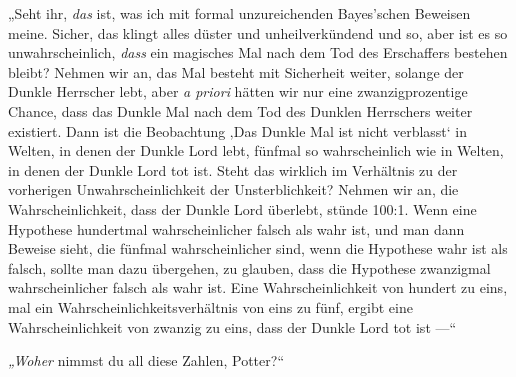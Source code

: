 „Seht ihr, \emph{das} ist, was ich mit formal unzureichenden Bayes’schen Beweisen meine. Sicher, das klingt alles düster und unheilverkündend und so, aber ist es so unwahrscheinlich, \emph{dass} ein magisches Mal nach dem Tod des Erschaffers bestehen bleibt? Nehmen wir an, das Mal besteht mit Sicherheit weiter, solange der Dunkle Herrscher lebt, aber \emph{a priori} hätten wir nur eine zwanzigprozentige Chance, dass das Dunkle Mal nach dem Tod des Dunklen Herrschers weiter existiert. Dann ist die Beobachtung ‚Das Dunkle Mal ist nicht verblasst‘ in Welten, in denen der Dunkle Lord lebt, fünfmal so wahrscheinlich wie in Welten, in denen der Dunkle Lord tot ist. Steht das wirklich im Verhältnis zu der vorherigen Unwahrscheinlichkeit der Unsterblichkeit? Nehmen wir an, die Wahrscheinlichkeit, dass der Dunkle Lord überlebt, stünde 100:1. Wenn eine Hypothese hundertmal wahrscheinlicher falsch als wahr ist, und man dann Beweise sieht, die fünfmal wahrscheinlicher sind, wenn die Hypothese wahr ist als falsch, sollte man dazu übergehen, zu glauben, dass die Hypothese zwanzigmal wahrscheinlicher falsch als wahr ist. Eine Wahrscheinlichkeit von hundert zu eins, mal ein Wahrscheinlichkeitsverhältnis von eins zu fünf, ergibt eine Wahrscheinlichkeit von zwanzig zu eins, dass der Dunkle Lord tot ist —“

\emph{„Woher} nimmst du all diese Zahlen, Potter?“

